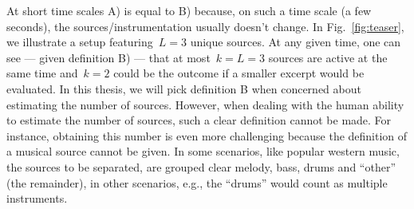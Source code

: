 At short time scales A) is equal to B) because, on such a time scale (a few seconds), the sources/instrumentation usually doesn't change. 
In Fig.~\ref{fig:teaser}, we illustrate a setup featuring~$L=3$ unique sources.
At any given time, one can see --- given definition B) --- that at most~$k=L=3$ sources are active at the same time and~$k=2$ could be the outcome if a smaller excerpt would be evaluated.
In this thesis, we will pick definition B when concerned about estimating the number of sources.
However, when dealing with the human ability to estimate the number of sources, such a clear definition cannot be made.
For instance, obtaining this number is even more challenging because the definition of a musical source cannot be given.
In some scenarios, like popular western music, the sources to be separated, are grouped clear melody, bass, drums and ``other'' (the remainder), in other scenarios, e.g., the ``drums'' would count as multiple instruments.



